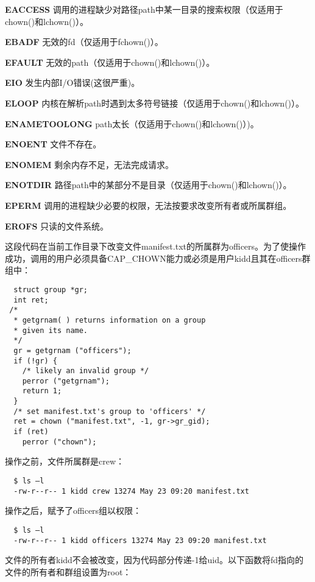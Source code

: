 \begin{eqlist*}
\item[\textbf{EACCESS}] 调用的进程缺少对路径path中某一目录的搜索权限（仅适用于chown()和lchown()）。
\item[\textbf{EBADF}] 无效的fd（仅适用于fchown()）。
\item[\textbf{EFAULT}] 无效的path（仅适用于chown()和lchown()）。
\item[\textbf{EIO}] 发生内部I/O错误(这很严重)。
\item[\textbf{ELOOP}] 内核在解析path时遇到太多符号链接（仅适用于chown()和lchown()）。 
\item[\textbf{ENAMETOOLONG}] path太长（仅适用于chown()和lchown()）)。
\item[\textbf{ENOENT}] 文件不存在。
\item[\textbf{ENOMEM}] 剩余内存不足，无法完成请求。
\item[\textbf{ENOTDIR}] 路径path中的某部分不是目录（仅适用于chown()和lchown()）。
\item[\textbf{EPERM}] 调用的进程缺少必要的权限，无法按要求改变所有者或所属群组。
\item[\textbf{EROFS}] 只读的文件系统。
\end{eqlist*}

这段代码在当前工作目录下改变文件manifest.txt的所属群为officers。为了使操作成功，调用的用户必须具备CAP\_CHOWN能力或必须是用户kidd且其在officers群组中：

\begin{lstlisting}
  struct group *gr;
  int ret;
 /*
  * getgrnam( ) returns information on a group
  * given its name.
  */
  gr = getgrnam ("officers");
  if (!gr) {
    /* likely an invalid group */
    perror ("getgrnam");
    return 1;
  }
  /* set manifest.txt's group to 'officers' */
  ret = chown ("manifest.txt", -1, gr->gr_gid);
  if (ret)
    perror ("chown");
\end{lstlisting}

操作之前，文件所属群是crew：

\begin{verbatim}
  $ ls –l
  -rw-r--r-- 1 kidd crew 13274 May 23 09:20 manifest.txt
\end{verbatim}

操作之后，赋予了officers组以权限：

\begin{verbatim}
  $ ls –l
  -rw-r--r-- 1 kidd officers 13274 May 23 09:20 manifest.txt
\end{verbatim}

文件的所有者kidd不会被改变，因为代码部分传递-1给uid。以下函数将fd指向的文件的所有者和群组设置为root：

